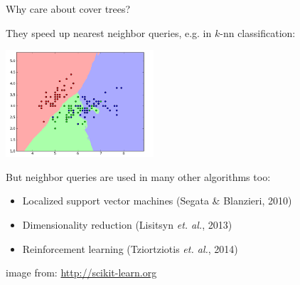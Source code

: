 \begin{frame}[fragile]{Why care about cover trees?}

They speed up nearest neighbor queries, e.g. in
 $k$-nn classification:

\begin{center}
\includegraphics[width=5.5cm]{covertree/knn.png}
\end{center}

But neighbor queries are used in many other algorithms too:
\begin{itemize}
\item Localized support vector machines (Segata \& Blanzieri, 2010)
\item Dimensionality reduction (Lisitsyn \emph{et. al.}, 2013)
\item Reinforcement learning (Tziortziotis \emph{et. al.}, 2014)
\end{itemize}

\vspace{0.05in}
{\tiny image from: \url{http://scikit-learn.org}}

\end{frame}

